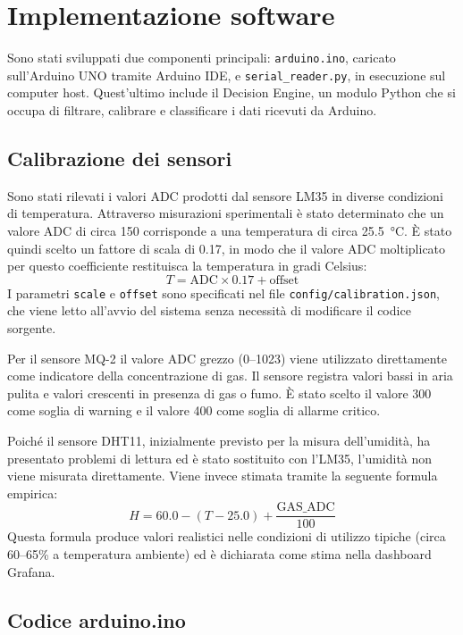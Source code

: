 \documentclass{article}
\begin{document}
\section{Implementazione software}

Sono stati sviluppati due componenti principali: \texttt{arduino.ino}, caricato
sull'Arduino UNO tramite Arduino IDE, e \texttt{serial\_reader.py}, in esecuzione
sul computer host. Quest'ultimo include il Decision Engine, un modulo Python
che si occupa di filtrare, calibrare e classificare i dati ricevuti da Arduino.

\subsection{Calibrazione dei sensori}

Sono stati rilevati i valori ADC prodotti dal sensore LM35 in diverse condizioni
di temperatura. Attraverso misurazioni sperimentali è stato determinato che un
valore ADC di circa 150 corrisponde a una temperatura di circa 25.5~°C. È stato
quindi scelto un fattore di scala di 0.17, in modo che il valore ADC moltiplicato
per questo coefficiente restituisca la temperatura in gradi Celsius:
\[
T = \text{ADC} \times 0.17 + \text{offset}
\]
I parametri \texttt{scale} e \texttt{offset} sono specificati nel file
\texttt{config/calibration.json}, che viene letto all'avvio del sistema senza
necessità di modificare il codice sorgente.

Per il sensore MQ-2 il valore ADC grezzo (0--1023) viene utilizzato direttamente
come indicatore della concentrazione di gas. Il sensore registra valori bassi
in aria pulita e valori crescenti in presenza di gas o fumo. È stato scelto il
valore 300 come soglia di warning e il valore 400 come soglia di allarme critico.

Poiché il sensore DHT11, inizialmente previsto per la misura dell'umidità,
ha presentato problemi di lettura ed è stato sostituito con l'LM35, l'umidità
non viene misurata direttamente. Viene invece stimata tramite la seguente
formula empirica:
\[
H = 60.0 - (T - 25.0) + \frac{\text{GAS\_ADC}}{100}
\]
Questa formula produce valori realistici nelle condizioni di utilizzo tipiche
(circa 60--65\% a temperatura ambiente) ed è dichiarata come stima nella
dashboard Grafana.

\subsection{Codice arduino.ino}
\end{document}
